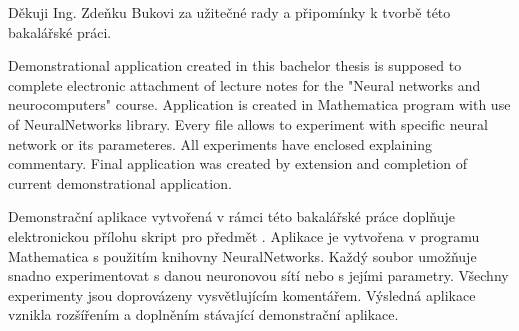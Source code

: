 \documentclass[11pt,twoside,a4paper]{book}
\begin{document}

\coverpagestarts


\acknowledgements
\noindent
Děkuji Ing. Zdeňku Bukovi za užitečné rady a připomínky k tvorbě této bakalářské práci.





 
\abstractpage

Demonstrational application created in this bachelor thesis is supposed to complete electronic attachment of lecture notes for the "Neural networks and neurocomputers" course. Application is created in Mathematica program with use of NeuralNetworks library. Every file allows to experiment with specific neural network or its parameteres. All experiments have enclosed explaining commentary. Final application was created by extension and completion of current demonstrational application.

\baselineskip

\noindent
Demonstrační aplikace vytvořená v rámci této bakalářské práce doplňuje elektronickou přílohu skript pro předmět . Aplikace je vytvořena v programu Mathematica s použitím knihovny NeuralNetworks. Každý soubor umožňuje snadno experimentovat s danou neuronovou sítí nebo s jejími parametry. Všechny experimenty jsou doprovázeny vysvětlujícím komentářem. Výsledná aplikace vznikla rozšířením a doplněním stávající demonstrační aplikace.


\tableofcontents



\listoffigures



\listoftables


\end{document}
